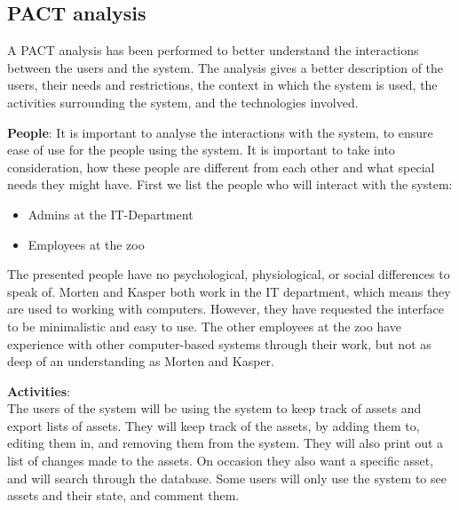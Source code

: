 \subsection{PACT analysis}\label{ssc:PACT}
A PACT analysis has been performed to better understand the interactions between the users and the system. The analysis gives a better description of the users, their needs and restrictions, the context in which the system is used, the activities surrounding the system, and the technologies involved.

\textbf{People}:
It is important to analyse the interactions with the system, to ensure ease of use for the people using the system. It is important to take into consideration, how these people are different from each other and what special needs they might have. First we list the people who will interact with the system:

\begin{itemize}
    \setlength\itemsep{0.05em}
    \item Admins at the IT-Department
    \item Employees at the zoo
\end{itemize}

The presented people have no psychological, physiological, or social differences to speak of. Morten and Kasper both work in the IT department, which means they are used to working with computers. However, they have requested the interface to be minimalistic and easy to use. The other employees at the zoo have experience with other computer-based systems through their work, but not as deep of an understanding as Morten and Kasper.
\par

\textbf{Activities}: \\
The users of the system will be using the system to keep track of assets and export lists of assets. They will keep track of the assets, by adding them to, editing them in, and removing them from the system. They will also print out a list of changes made to the assets. On occasion they also want a specific asset, and will search through the database. Some users will only use the system to see assets and their state, and comment them.
\par

